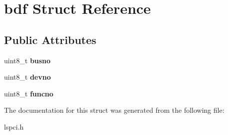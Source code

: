 \hypertarget{structbdf}{}\section{bdf Struct Reference}
\label{structbdf}
\subsection*{Public Attributes}
\begin{DoxyCompactItemize}
\item 
\mbox{\label{structbdf_a762c84123179ffb0b3ad429b62ec3a7f}} 
uint8\+\_\+t {\bfseries busno}
\item 
\mbox{\label{structbdf_a0006c4f9af15bfdf335946b00b5fc607}} 
uint8\+\_\+t {\bfseries devno}
\item 
\mbox{\label{structbdf_a8d29b242e2219cf5f0b6d68f4f724a25}} 
uint8\+\_\+t {\bfseries funcno}
\end{DoxyCompactItemize}


The documentation for this struct was generated from the following file\+:\begin{DoxyCompactItemize}
\item 
lspci.\+h\end{DoxyCompactItemize}
